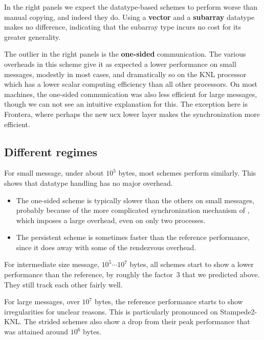 In the right panels we expect the datatype-based schemes to perform worse than
manual copying, and indeed they do. Using a \textbf{vector} and a \textbf{subarray} datatype
makes no difference, indicating that the subarray type incurs no cost for its
greater generality.

The outlier in the right panels is the \textbf{one-sided} communication.
The various overheads in this scheme give it as expected
a lower performance on small messages, modestly in most cases, and
dramatically so on the KNL processor which has a lower scalar computing
efficiency than all other processors.
On most machines, the one-sided communication was also less efficient
for large messages, though we can not see an intuitive explanation for this.
The exception here is Frontera, where perhaps the new ucx lower layer
makes the synchronization more efficient.

\subsection{Different regimes}

For small message, under about $10^5$ bytes, most schemes perform
similarly. This shows that datatype handling has no major overhead.
\begin{itemize}
\item The one-sided scheme is typically slower than the others on small messages,
  probably because
  of the more complicated synchronization mechanism of
  , which imposes a large overhead,
  even on only two processes.
\item The persistent scheme is sometimes faster than the reference performance,
  since it does away with some of the rendezvous overhead.
\end{itemize}

For intermediate size message, $10^5\cdots 10^7$ bytes,
all schemes start to show a lower performance than the reference,
by roughly the factor~3 that we predicted above.
They still track each other fairly well. 

For large messages, over $10^7$ bytes,
the reference performance starts to show irregularities
for unclear reasons. This is particularly pronounced on Stampede2-KNL.
The strided schemes also show a drop from their peak performance
that was attained around $10^6$ bytes.

